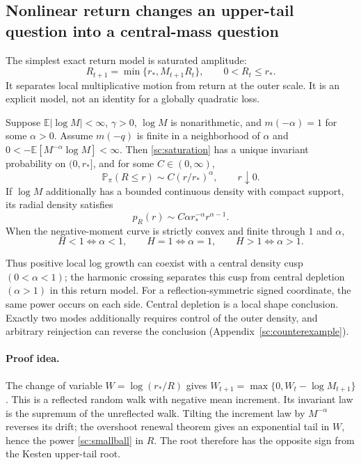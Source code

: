 \subsection{Nonlinear return changes an upper-tail question into a central-mass question}
The simplest exact return model is saturated amplitude:
\begin{equation}
 R_{t+1}=\min\{r_*,M_{t+1}R_t\},\qquad 0<R_t\le r_*.
 \label{sc:saturation}
\end{equation}
It separates local multiplicative motion from return at the outer scale.
It is an explicit model, not an identity for a globally quadratic loss.

\begin{theorem}\label{sc:central-law}
Suppose \(\mathbb E|\log M|<\infty\), \(\gamma>0\),
\(\log M\) is nonarithmetic, and
\(m(-\alpha)=1\) for some \(\alpha>0\). Assume \(m(-q)\) is finite in a
neighborhood of \(\alpha\) and
\(0<-\mathbb E[M^{-\alpha}\log M]<\infty\).
Then \eqref{sc:saturation} has a unique invariant probability on
\((0,r_*]\), and for some \(C\in(0,\infty)\),
\begin{equation}
 \mathbb P_\pi(R\le r)\sim C(r/r_*)^\alpha,\qquad r\downarrow0.
 \label{sc:smallball}
\end{equation}
If \(\log M\) additionally has a bounded continuous density with compact
support, its radial density satisfies
\[
 p_R(r)\sim C\alpha r_*^{-\alpha}r^{\alpha-1}.
\]
When the negative-moment curve is strictly convex and finite through
\(1\) and \(\alpha\),
\begin{equation}
 H<1\Longleftrightarrow\alpha<1,\qquad
 H=1\Longleftrightarrow\alpha=1,\qquad
 H>1\Longleftrightarrow\alpha>1.
 \label{sc:shape-ladder}
\end{equation}
\end{theorem}

Thus positive local log growth can coexist with a central density cusp
\((0<\alpha<1)\); the harmonic crossing separates this cusp from central
depletion \((\alpha>1)\) in this return model. For a reflection-symmetric
signed coordinate, the same power occurs on each side. Central depletion
is a local shape conclusion. Exactly two modes additionally requires
control of the outer density, and arbitrary reinjection can reverse the
conclusion (Appendix~\ref{sc:counterexample}).

\paragraph{Proof idea.}
The change of variable \(W=\log(r_*/R)\) gives
\(W_{t+1}=\max\{0,W_t-\log M_{t+1}\}\).
This is a reflected random walk with negative mean increment.
Its invariant law is the supremum of the unreflected walk. Tilting the
increment law by \(M^{-\alpha}\) reverses its drift; the overshoot renewal
theorem gives an exponential tail in \(W\), hence the power
\eqref{sc:smallball} in \(R\). The root therefore has the opposite sign
from the Kesten upper-tail root.

